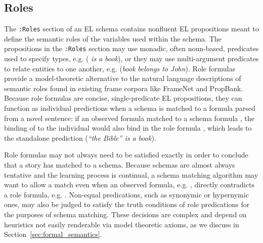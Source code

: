 \subsection{Roles}
\label{sec:roles}
The \texttt{:Roles} section of an EL schema contains nonfluent EL propositions meant to define the semantic roles of the variables used within the schema. The propositions in the \texttt{:Roles} section may use monadic, often noun-based, predicates used to specify types, e.g.  ( \textit{is a book}), or they may use multi-argument predicates to relate entities to one another, e.g.  (\textit{book}  \textit{belongs to John}). Role formulas provide a model-theoretic alternative to the natural language descriptions of semantic roles found in existing frame corpora like FrameNet and PropBank. Because role formulas are concise, single-predicate EL propositions, they can function as individual predictions when a schema is matched to a formula parsed from a novel sentence: if an observed formula  matched to a schema formula , the binding of  to the individual  would also bind  in the role formula , which leads to the standalone prediction  (\textit{``the Bible'' is a book}).

Role formulas may not always need to be satisfied exactly in order to conclude that a story has matched to a schema. Because schemas are almost always tentative and the learning process is continual, a schema matching algorithm may want to allow a match even when an observed formula, e.g. , directly contradicts a role formula, e.g. . Non-equal predications, such as synonymic or hypernymic ones, may also be judged to satisfy the truth conditions of role predications for the purposes of schema matching. These decisions are complex and depend on heuristics not easily renderable via model theoretic axioms, as we discuss in Section~\ref{sec:formal_semantics}.



